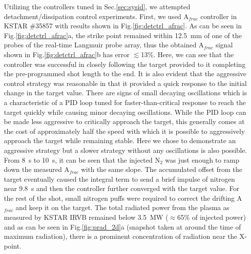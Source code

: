 \documentclass[10pt]{iopart}
\newcommand{\Afrac}{A$_{frac}$}
\begin{document}
Utilizing the controllers tuned in Sec.\ref{sec:sysid}, we attempted detachment/dissipation control experiments.
First, we used \Afrac{} controller in KSTAR \#35857 with results shown in Fig.\ref{fig:detctrl_afrac}.
As can be seen in Fig.\ref{fig:detctrl_afrac}a, the strike point remained within 12.5~mm of one of the probes of the real-time Langmuir probe array, thus the obtained \Afrac{} signal shown in Fig.\ref{fig:detctrl_afrac}b has error $\lesssim$13\%.
Here, we can see that the controller was successful in closely following the target provided to it completing the pre-programmed shot length to the end.
It is also evident that the aggressive control strategy was reasonable in that it provided a quick response to the initial change in the target value.
There are signs of small decaying oscillations which is a characteristic of a PID loop tuned for faster-than-critical response to reach the target quickly while causing minor decaying oscillations.
While the PID loop can be made less aggressive to critically approach the target, this generally comes at the cost of approximately half the speed with which it is possible to aggressively approach the target while remaining stable.
Here we chose to demonstrate an aggressive strategy but a slower strategy without any oscillations is also possible.
From 8~s to 10~s, it can be seen that the injected N$_2$ was just enough to ramp down the measured \Afrac{} with the same slope.
The accumulated offset from the target eventually caused the integral term to send a brief impulse of nitrogen near 9.8~s and then the controller further converged with the target value.
For the rest of the shot, small nitrogen puffs were required to correct the drifting \Afrac{} and keep it on the target.
The total radiated power from the plasma as measured by KSTAR \ac{IRVB} remained below 3.5~MW ($\approx$65\% of injected power) and as can be seen in Fig.\ref{fig:prad_2d}a (snapshot taken at around the time of maximum radiation), there is a prominent concentration of radiation near the X-point.
\end{document}
